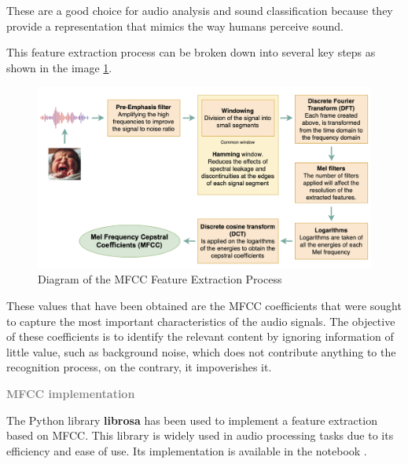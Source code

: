 \begin{tcolorbox}
These are a good choice for audio analysis and sound classification because they provide a representation that mimics the way humans perceive sound.
\end{tcolorbox}
\vspace{\baselineskip}
This feature extraction process can be broken down into several key steps as shown in the image \ref{fig:MFCC-diagram}.

\begin{figure}[h]
\centering
    \includegraphics[width=1\textwidth]{figures/MFCC-diagram.png}
\caption{Diagram of the MFCC Feature Extraction Process}
\label{fig:MFCC-diagram}
\end{figure}
\vspace{\baselineskip}
\begin{tcolorbox}
These values that have been obtained are the MFCC coefficients that were sought to capture the most important characteristics of the audio signals. The objective of these coefficients is to identify the relevant content by ignoring information of little value, such as background noise, which does not contribute anything to the recognition process, on the contrary, it impoverishes it.
\end{tcolorbox}

\newpage

{\fontsize{16pt}{16pt}\textcolor{gray}{\textbf{MFCC implementation}}}

The Python library \textbf{librosa} has been used to implement a feature extraction based on MFCC. This library is widely used in audio processing tasks due to its efficiency and ease of use. Its implementation is available in the notebook .

